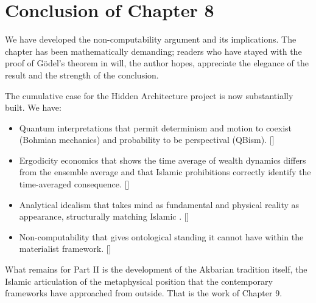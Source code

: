 \section{Conclusion of Chapter 8}

We have developed the non-computability argument and its
implications. The chapter has been mathematically demanding;
readers who have stayed with the proof of G\"odel's theorem in
 will, the author hopes, appreciate the
elegance of the result and the strength of the conclusion.

The cumulative case for the Hidden Architecture project is now
substantially built. We have:

\begin{itemize}[leftmargin=2em]
    \item Quantum interpretations that permit determinism and
    motion to coexist (Bohmian mechanics) and probability to be
    perspectival (QBism). []
    \item Ergodicity economics that shows the time average of
    wealth dynamics differs from the ensemble average and that
    Islamic prohibitions correctly identify the time-averaged
    consequence. []
    \item Analytical idealism that takes mind as fundamental and
    physical reality as appearance, structurally matching Islamic
    . []
    \item Non-computability that gives  ontological
    standing it cannot have within the materialist framework.
    []
\end{itemize}

What remains for Part II is the development of the Akbarian
tradition itself, the Islamic articulation of the metaphysical
position that the contemporary frameworks have approached from
outside. That is the work of Chapter 9.


